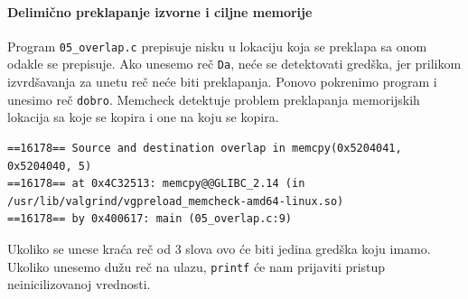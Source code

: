 \paragraph{Delimično preklapanje izvorne i ciljne memorije}\label{delimiux10dno-preklapanje-izvorne-i-ciljne-memorije}

Program \texttt{05\_overlap.c} prepisuje nisku u lokaciju koja se preklapa sa onom odakle se prepisuje. Ako unesemo reč \texttt{Da}, neće se detektovati gredška, jer prilikom izvrdšavanja za unetu reč neće biti preklapanja. Ponovo pokrenimo program i unesimo reč \texttt{dobro}. Memcheck detektuje problem preklapanja memorijskih lokacija sa koje se kopira i one na koju se kopira.

\begin{verbatim}
==16178== Source and destination overlap in memcpy(0x5204041, 0x5204040, 5)
==16178== at 0x4C32513: memcpy@@GLIBC_2.14 (in /usr/lib/valgrind/vgpreload_memcheck-amd64-linux.so)
==16178== by 0x400617: main (05_overlap.c:9)
\end{verbatim}

Ukoliko se unese kraća reč od 3 slova ovo će biti jedina gredška koju imamo. Ukoliko unesemo dužu reč na ulazu, \texttt{printf} će nam prijaviti pristup neinicilizovanoj vrednosti.
